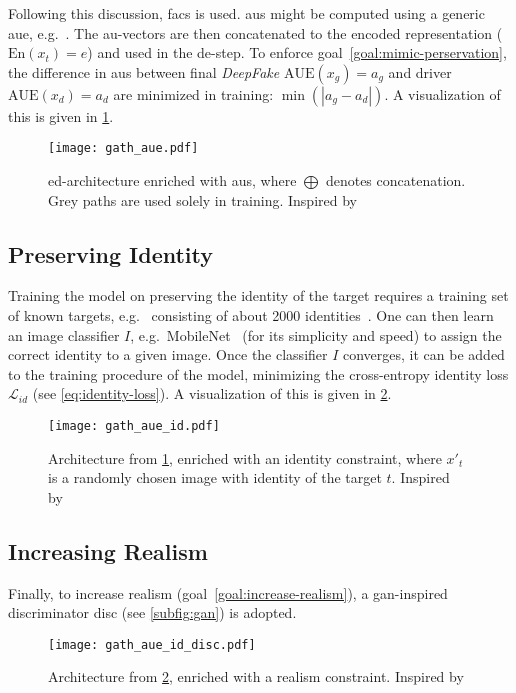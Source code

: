\par
Following this discussion, \gls{facs} is used. \Glspl{au} might be computed using
a generic \gls{aue}, e.g.\ \cite{Senechal.2015}. The \gls{au}-vectors are then
concatenated to the encoded representation (\(\text{En}(x_t)=e\)) and used in
the \gls{de}-step. To enforce goal~\ref{goal:mimic-perservation}, the difference
in \glspl{au} between final \textit{DeepFake} \(\text{AUE}(x_g)=a_g\) and driver
\(\text{AUE}(x_d)=a_d\) are minimized in training: \(\min{(\left|a_g-a_d\right|)}\).
A visualization of this is given in \cref{fig:gath-aue}.
\begin{figure}[htp]
    \center{}
    \vspace{-.5em}
    \texttt{[image: gath\_aue.pdf]}
    \caption{\gls{ed}-architecture enriched with \glspl{au}, where \(\bigoplus\)
    denotes concatenation. Grey paths are used solely in training. Inspired
    by~\cite{Mirsky.2020, Pham.2018}}\label{fig:gath-aue}
    \vspace{-2em}
\end{figure}

\subsection{Preserving Identity}
Training the model on preserving the identity of the target requires a training
set of known targets, e.g.\ \cite{Chen.2015,Cao.2014,Tarres.2011} consisting of 
about 2000 identities~\cite{Pham.2018}. One can then learn an image classifier
\(I\), e.g.\ MobileNet~\cite{Howard.2017} (for its simplicity and speed) to
assign the correct identity to a given image. Once the classifier \(I\)
converges, it can be added to the training procedure of the model, minimizing
the cross-entropy identity loss \(\mathcal{L}_{id}\) (see \cref{eq:identity-loss}).
A visualization of this is given in \cref{fig:gath-aue-id}.
\begin{figure}[htp]
    \vspace{-.5em}
    \center{}
    \texttt{[image: gath\_aue\_id.pdf]}
    \caption{Architecture from \cref{fig:gath-aue}, enriched with an identity
    constraint, where \(x'_t\) is a randomly chosen image with identity of the target
    \(t\). Inspired by~\cite{Mirsky.2020, Pham.2018}}\label{fig:gath-aue-id}
    \vspace{-2em}
\end{figure}

\subsection{Increasing Realism}
Finally, to increase realism (goal~\ref{goal:increase-realism}), a \gls{gan}-inspired
discriminator \gls{disc} (see \cref{subfig:gan}) is adopted.
\begin{figure}[htp]
    \vspace{-.5em}
    \center{}
    \texttt{[image: gath\_aue\_id\_disc.pdf]}
    \caption{Architecture from \cref{fig:gath-aue-id}, enriched with a realism
    constraint. Inspired by~\cite{Mirsky.2020, Pham.2018}}\label{fig:gath-aue-id-disc}
    \vspace{-2em}
\end{figure}